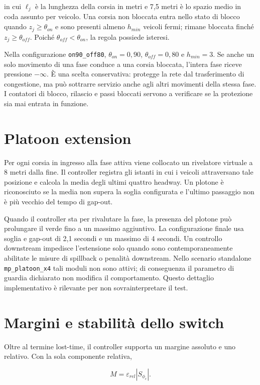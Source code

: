 \documentclass[12pt,a4paper,oneside]{report}
\numberwithin{equation}{chapter}
\begin{document}
in cui $\ell_j$ è la lunghezza della corsia in metri e 7,5 metri è lo spazio
medio in coda assunto per veicolo. Una corsia non bloccata entra nello stato di
blocco quando $z_j\geq\theta_{on}$ e sono presenti almeno $h_{min}$ veicoli
fermi; rimane bloccata finché $z_j\geq\theta_{off}$. Poiché
$\theta_{off}<\theta_{on}$, la regola possiede isteresi.

Nella configurazione \texttt{on90\_off80}, $\theta_{on}=0{,}90$,
$\theta_{off}=0{,}80$ e $h_{min}=3$. Se anche un solo movimento di una fase
conduce a una corsia bloccata, l'intera fase riceve pressione $-\infty$. È una
scelta conservativa: protegge la rete dal trasferimento di congestione, ma può
sottrarre servizio anche agli altri movimenti della stessa fase. I contatori
di blocco, rilascio e passi bloccati servono a verificare se la protezione sia
mai entrata in funzione.

\section{Platoon extension}

Per ogni corsia in ingresso alla fase attiva viene collocato un rivelatore virtuale
a 8 metri dalla fine. Il controller registra gli istanti in cui i veicoli
attraversano tale posizione e calcola la media degli ultimi quattro headway.
Un plotone è riconosciuto se la media non supera la soglia configurata e
l'ultimo passaggio non è più vecchio del tempo di gap-out.

Quando il controller sta per rivalutare la fase, la presenza del plotone
può prolungare il verde fino a un massimo aggiuntivo. La configurazione finale
usa soglia e gap-out di 2,1 secondi e un massimo di 4 secondi. Un controllo
downstream impedisce l'estensione solo quando sono contemporaneamente abilitate
le misure di spillback o penalità downstream. Nello scenario standalone
\texttt{mp\_platoon\_x4} tali moduli non sono attivi; di conseguenza il
parametro di guardia dichiarato non modifica il comportamento. Questo dettaglio
implementativo è rilevante per non sovrainterpretare il test.

\section{Margini e stabilità dello switch}

Oltre al termine lost-time, il controller supporta un margine assoluto e uno
relativo. Con la sola componente relativa,

\begin{equation}
    M=\varepsilon_{rel}|S_{\phi_c}|.
\end{equation}
\end{document}
